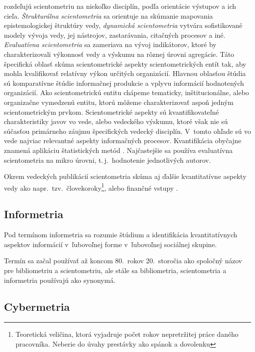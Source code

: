 \citet{Glanzel2004} rozdeľujú scientometriu na niekoľko disciplín, podľa
orientácie výstupov a ich cieľa.  \emph{Štrukturálna scientometria} sa orientuje
na skúmanie mapovania epistemologickej štruktúry vedy, \emph{dynamická
  scientometria} vytvára sofistikované modely vývoja vedy, jej nástrojov,
zastarávania, citačných procesov a iné.  \emph{Evaluatívna scientometria} sa
zameriava na vývoj indikátorov, ktoré by charakterizovali výkonnosť vedy a
výskumu na rôznej úrovni agregácie.  Táto špecifická oblasť skúma
scientometrické aspekty scientometrických entít tak, aby mohla kvalifikovať
relatívny výkon určitých organizácií.  Hlavnou oblasťou štúdia sú komparatívne
štúdie informačnej produkcie a vplyvu informácií hodnotených organizácií.  Ako
scientometrickú entitu chápeme tematicky, inštitucionálne, alebo organizačne
vymedzenú entitu, ktorú môžeme charakterizovať aspoň jedným scientometrickým
prvkom.  Scientometrické aspekty sú kvantifikovateľné charakteristiky javov vo
vede, alebo vedeckého výskumu, ktoré však nie sú súčasťou primárneho záujmu
špecifických vedecký disciplín.  V~tomto ohľade sú vo vede najviac relevantné
aspekty informačných procesov.  Kvantifikácia obyčajne znamená aplikáciu
štatistických metód \citep{Vinkler2001}.  Najčastejšie sa používa evaluatívna
scientometria na mikro úrovni, t.\,j.~hodnotenie jednotlivých autorov.

Okrem vedeckých publikácií scientometria skúma aj ďalšie kvantitatívne aspekty
vedy ako napr.~tzv.~človekoroky\footnote{Teoretická veličina, ktorá vyjadruje
  počet rokov nepretržitej práce daného pracovníka.  Neberie do úvahy prestávky
  ako spánok a dovolenku}, alebo finančné vstupy \citep{Bellis2009}.


\subsection{Informetria}

Pod termínom informetria sa rozumie štúdium a identifikácia kvantitatívnych
aspektov informácií v~ľubovoľnej forme v~ľubovoľnej sociálnej skupine.

Termín sa začal používať až koncom 80.~rokov 20.~storočia ako spoločný názov
pre bibliometriu a scientometriu, ale stále sa bibliometria, scientometria a
informetria používajú ako synonymá.


\subsection{Cybermetria}

